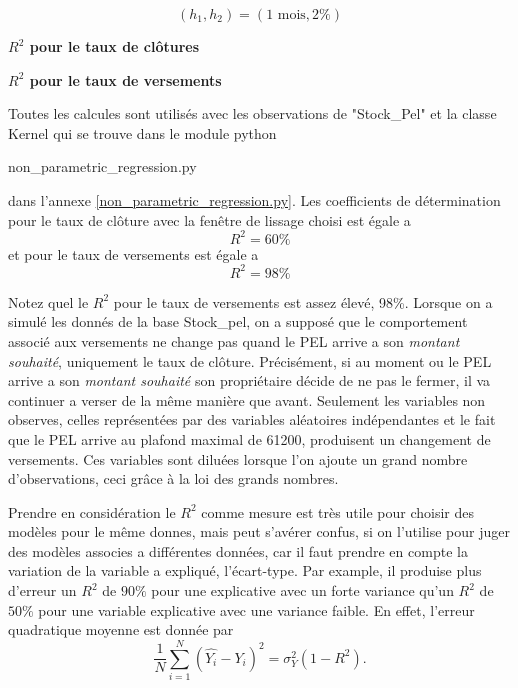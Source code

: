 \documentclass[12pt, a4paper]{book}
\begin{document}
$$ (h_1, h_2) = (1\mbox{ mois}, 2\%) $$ 

\begin{table}[h!]
	\caption{\bf $R^2$ pour le taux de clôtures}
	\bigskip	
	\label{grille_clotures}
	\centering
\end{table}

\begin{table}[h!]
	\caption{\bf $R^2$ pour le taux de versements}
	\bigskip	
	\label{grille_versements}
	\centering
\end{table}

Toutes les calcules sont utilisés avec les observations de "Stock\_Pel" et la classe Kernel qui se trouve dans le module python
\begin{center}
non\_parametric\_regression.py
\end{center}

dans l'annexe \ref{non_parametric_regression.py}. Les coefficients de détermination pour le taux de clôture avec la fenêtre de lissage choisi est égale a 
$$ R^2 = 60\%$$
et pour le taux de versements est égale a 
$$ R^2 = 98\%$$

{\label{aqui}
Notez quel le $R^2$ pour le taux de versements est assez élevé, 98\%. Lorsque on a simulé les donnés de la base Stock\_pel, on a supposé que le comportement associé aux versements ne change pas quand le PEL arrive a son {\it montant souhaité}, uniquement le taux de clôture. Précisément, si au moment ou le PEL arrive a son {\it montant souhaité} son propriétaire décide de ne pas le fermer, il va continuer a verser de la même manière que avant.  Seulement les variables non observes, celles représentées par des variables aléatoires indépendantes et le fait que le PEL arrive au plafond maximal de 61200, produisent un changement de versements. Ces variables sont diluées lorsque l'on ajoute un grand nombre d'observations, ceci grâce à la loi des grands nombres.
}

Prendre en considération le $R^2$ comme mesure est très utile pour choisir des modèles pour le même donnes, mais peut s'avérer confus, si on l'utilise pour juger des modèles associes a différentes données, car il faut prendre en compte la variation de la variable a expliqué, l'écart-type. Par example, il produise plus d'erreur un $R^2$  de $90\%$ pour une explicative avec un forte variance qu'un $R^2$ de $50 \%$ pour une variable explicative avec une variance faible. En effet, l'erreur quadratique moyenne est donnée par
$$\frac{1}{N}\sum_{i=1}^N(\hat{Y_i}-Y_i)^2  = \sigma_Y^2(1- R^2). $$
\end{document}
